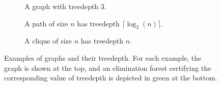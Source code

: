 \begin{figure}
    \begin{subfigure}[b]{0.28\textwidth}
        \caption{A graph with treedepth 3.}
    \end{subfigure}
    \begin{subfigure}[b]{0.47\textwidth}
        \caption{A path of size $n$ has treedepth $\lceil\log_2(n)\rceil$.}
    \end{subfigure}
    \begin{subfigure}[b]{0.24\textwidth}
        \caption{A clique of size $n$ has treedepth $n$.}
    \end{subfigure}
    
    \caption{Examples of graphs and their treedepth. For each example, the graph is shown at the top, and an elimination forest certifying the corresponding value of treedepth is depicted in green at the bottom.}
    \label{fig:treedepth-example}
\end{figure}